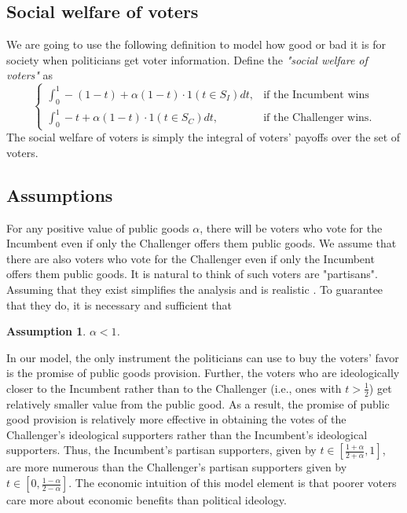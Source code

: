 \documentclass[12pt,english]{article}
\newtheorem{assumption}{Assumption}
\begin{document}
\subsection{Social welfare of voters}

We are going to use the following definition to model how good or bad it is for society when politicians get voter information. Define the \textit{"social welfare of voters"} as
\begin{equation}
\label{voter_payoff_informed_new}
\begin{cases}
		\int_0^1 -(1-t) + \alpha (1 - t) \cdot 1(t \in S_I) dt, & \text{if the Incumbent wins}\\
       \int_0^1  -t + \alpha (1 - t) \cdot 1(t \in S_C) dt , & \text{if the Challenger wins}.
		 \end{cases}
\end{equation}
The social welfare of voters is simply the integral of voters' payoffs over the set of voters. 

\subsection{Assumptions}


For any positive value of public goods $\alpha$, there will be voters who vote for the Incumbent even if only the Challenger offers them public goods. We assume that there are also voters who vote for the Challenger even if only the Incumbent offers them public goods. It is natural to think of such voters are "partisans". Assuming that they exist simplifies the analysis and is realistic \citep{hillygus2008persuadable}. To guarantee that they do, it is necessary and sufficient that 
\begin{assumption}
$\alpha < 1$.
\end{assumption}
In our model, the only instrument the politicians can use to buy the voters' favor is the promise of public goods provision. Further, the voters who are ideologically closer to the Incumbent rather than to the Challenger (i.e., ones with $t>\frac{1}{2}$) get relatively smaller value from the public good. As a result, the promise of public good provision is relatively more effective in obtaining the votes of the Challenger's ideological supporters rather than the Incumbent's ideological supporters. Thus, the Incumbent's partisan supporters, given by $t\in\left[\frac{1+\alpha}{2+\alpha}, 1\right]$, are more numerous than the Challenger's partisan supporters given by  $t\in \left[0,\frac{1-\alpha}{2-\alpha}\right]$. The economic intuition of this model element is that poorer voters care more about economic benefits than political ideology. 
\end{document}
